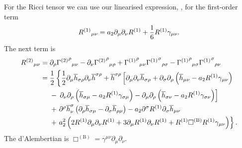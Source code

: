 For the Ricci tensor we can use our linearised expression, , for the first-order term
\begin{equation}
{R^{(1)}}_{\mu\nu} = a_2\partial_\mu\partial_\nu R^{(1)} + \dfrac{1}{6} R^{(1)}\gamma_{\mu\nu}.
\end{equation}
The next term is
\begin{align}
{R^{(2)}}_{\mu\nu} = {} & \partial_\rho {{\Gamma^{(2)}}^\rho}_{\mu\nu} - \partial_\nu {{\Gamma^{(2)}}^\rho}_{\mu\rho} + {{\Gamma^{(1)}}^\rho}_{\mu\nu}{{\Gamma^{(1)}}^\sigma}_{\rho\sigma} - {{\Gamma^{(1)}}^\rho}_{\mu\sigma}{{\Gamma^{(1)}}^\sigma}_{\rho\nu} \nonumber \\
 = {} & \dfrac{1}{2}\left\{\recip{2}\partial_\mu\overline{h}_{\sigma\rho}\partial_\nu\overline{h}^{\sigma\rho} + \overline{h}^{\sigma\rho}\left[\partial_\mu\partial_\nu\overline{h}_{\sigma\rho} \vphantom{R^{(1)}} + \partial_\sigma\partial_\rho\left(\overline{h}_{\mu\nu} - a_2 R^{(1)}\gamma_{\mu\nu}\right) \right.\right. \nonumber \\*
  & - \left.\left. \partial_\nu\partial_\rho\left(\overline{h}_{\sigma\mu} \vphantom{R^{(1)}} - a_2 R^{(1)} \gamma_{\sigma\mu}\right) - \partial_\mu\partial_\rho\left(\overline{h}_{\sigma\nu} - a_2 R^{(1)} \gamma_{\sigma\nu}\right)\right] \right. \nonumber \\*
  & + \left. \partial^\rho\overline{h}^\sigma_\nu\left(\partial_\rho\overline{h}_{\sigma\mu} - \partial_\sigma\overline{h}_{\rho\mu}\right) - a_2 \partial^\sigma R^{(1)}\partial_\sigma\overline{h}_{\mu\nu} \right. \nonumber \\*
  & + \left. a_2^2 \left(2R^{(1)}\partial_\mu\partial_\nu R^{(1)} + 3\partial_\mu R^{(1)}\partial_\nu R^{(1)} + R^{(1)} \Box^{(\text{B})} R^{(1)} \gamma_{\mu\nu}\right)\right\}.
\end{align}
The d'Alembertian is $\Box^{(\text{B})} = \gamma^{\mu\nu}\partial_\mu\partial_\nu$.

